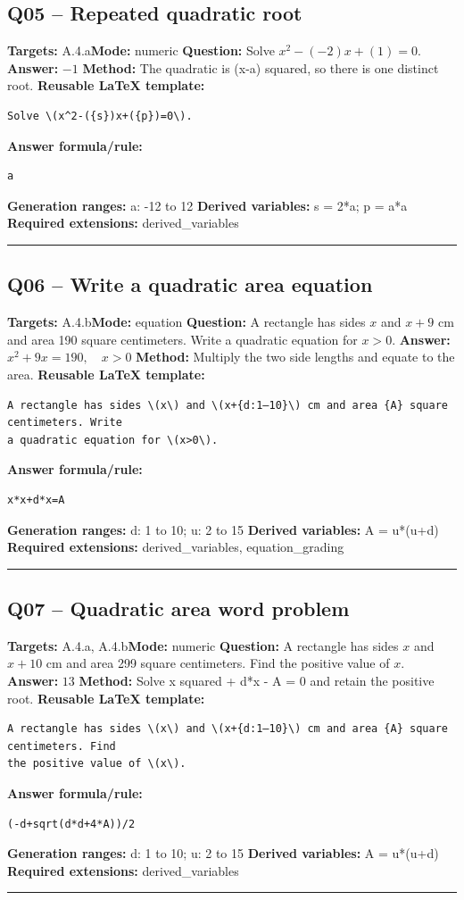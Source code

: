 \documentclass[11pt]{article}
\begin{document}
\subsection{Q05 -- Repeated quadratic root}
\textbf{Targets:} A.4.a\quad\textbf{Mode:} numeric
\textbf{Question:} Solve \(x^2-(-2)x+(1)=0\).
\textbf{Answer:} \(-1\)
\textbf{Method:} The quadratic is (x-a) squared, so there is one distinct root.
\textbf{Reusable LaTeX template:}
\begin{verbatim}
Solve \(x^2-({s})x+({p})=0\).
\end{verbatim}
\textbf{Answer formula/rule:}
\begin{verbatim}
a
\end{verbatim}
\textbf{Generation ranges:} a: -12 to 12
\textbf{Derived variables:} s = 2*a; p = a*a
\textbf{Required extensions:} derived\_variables
\medskip\hrule\medskip
\subsection{Q06 -- Write a quadratic area equation}
\textbf{Targets:} A.4.b\quad\textbf{Mode:} equation
\textbf{Question:} A rectangle has sides \(x\) and \(x+9\) cm and area 190 square centimeters. Write a quadratic equation for \(x>0\).
\textbf{Answer:} \(x^2+9x=190,\quad x>0\)
\textbf{Method:} Multiply the two side lengths and equate to the area.
\textbf{Reusable LaTeX template:}
\begin{verbatim}
A rectangle has sides \(x\) and \(x+{d:1–10}\) cm and area {A} square centimeters. Write
a quadratic equation for \(x>0\).
\end{verbatim}
\textbf{Answer formula/rule:}
\begin{verbatim}
x*x+d*x=A
\end{verbatim}
\textbf{Generation ranges:} d: 1 to 10; u: 2 to 15
\textbf{Derived variables:} A = u*(u+d)
\textbf{Required extensions:} derived\_variables, equation\_grading
\medskip\hrule\medskip
\subsection{Q07 -- Quadratic area word problem}
\textbf{Targets:} A.4.a, A.4.b\quad\textbf{Mode:} numeric
\textbf{Question:} A rectangle has sides \(x\) and \(x+10\) cm and area 299 square centimeters. Find the positive value of \(x\).
\textbf{Answer:} \(13\)
\textbf{Method:} Solve x squared + d*x - A = 0 and retain the positive root.
\textbf{Reusable LaTeX template:}
\begin{verbatim}
A rectangle has sides \(x\) and \(x+{d:1–10}\) cm and area {A} square centimeters. Find
the positive value of \(x\).
\end{verbatim}
\textbf{Answer formula/rule:}
\begin{verbatim}
(-d+sqrt(d*d+4*A))/2
\end{verbatim}
\textbf{Generation ranges:} d: 1 to 10; u: 2 to 15
\textbf{Derived variables:} A = u*(u+d)
\textbf{Required extensions:} derived\_variables
\medskip\hrule\medskip
\end{document}
